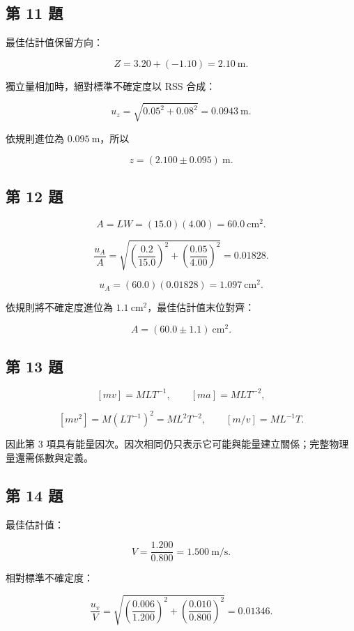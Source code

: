 \documentclass[11pt,a4paper]{article}
\begin{document}
\subsection{第 11 題}\label{ux7b2c-11-ux984c}

最佳估計值保留方向：

\[
Z=3.20+(-1.10)=2.10\ \mathrm{m}.
\]

獨立量相加時，絕對標準不確定度以 RSS 合成：

\[
u_z=\sqrt{0.05^2+0.08^2}=0.0943\ \mathrm{m}.
\]

依規則進位為 \(0.095\ \mathrm{m}\)，所以

\[
\boxed{z=(2.100\pm0.095)\ \mathrm{m}}.
\]

\subsection{第 12 題}\label{ux7b2c-12-ux984c}

\[
A=LW=(15.0)(4.00)=60.0\ \mathrm{cm^2}.
\]

\[
\frac{u_A}{A}
=\sqrt{\left(\frac{0.2}{15.0}\right)^2+
       \left(\frac{0.05}{4.00}\right)^2}
=0.01828.
\]

\[
u_A=(60.0)(0.01828)=1.097\ \mathrm{cm^2}.
\]

依規則將不確定度進位為 \(1.1\ \mathrm{cm^2}\)，最佳估計值末位對齊：

\[
\boxed{A=(60.0\pm1.1)\ \mathrm{cm^2}}.
\]

\subsection{第 13 題}\label{ux7b2c-13-ux984c}

\[
[mv]=MLT^{-1},\qquad
[ma]=MLT^{-2},
\]

\[
[mv^2]=M(LT^{-1})^2=ML^2T^{-2},\qquad
[m/v]=ML^{-1}T.
\]

因此第 3 項具有能量因次。因次相同仍只表示它可能與能量建立關係；完整物理量還需係數與定義。

\subsection{第 14 題}\label{ux7b2c-14-ux984c}

最佳估計值：

\[
V=\frac{1.200}{0.800}=1.500\ \mathrm{m/s}.
\]

相對標準不確定度：

\[
\frac{u_v}{V}
=\sqrt{\left(\frac{0.006}{1.200}\right)^2+
       \left(\frac{0.010}{0.800}\right)^2}
=0.01346.
\]
\end{document}
